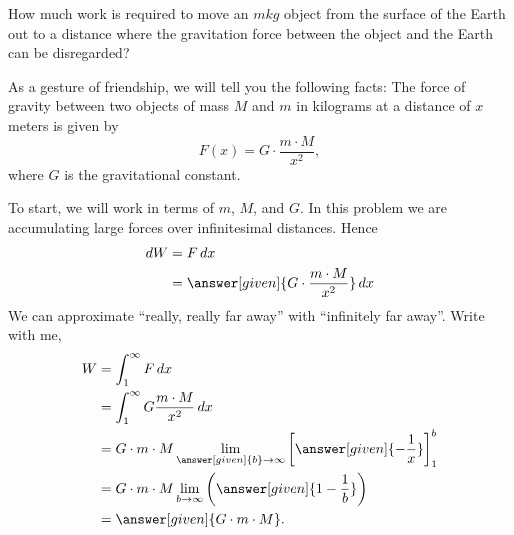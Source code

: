 \documentclass{ximera}
\begin{document}
\begin{example}
 How much work is required to move an $m\unit{kg}$ object from the
 surface of the Earth out to a distance where the gravitation force
 between the object and the Earth can be disregarded?

 As a gesture of friendship, we will tell you the following facts:
 The force of gravity between two objects of mass $M$ and $m$ in
 kilograms at a distance of $x$ meters is given by
 \[
 F(x) = G\cdot \frac{m\cdot M}{x^2},
 \]
 where $G$ is the gravitational constant.
 \begin{explanation}
   To start, we will work in terms of $m$, $M$, and $G$. In this
   problem we are accumulating large forces over infinitesimal
   distances. Hence
   \begin{align*}
     \d W &= F \d x\\
     &= \answer[given]{G\cdot \frac{m\cdot M}{x^2}} \d x
   \end{align*}
   We can approximate ``really, really far away'' with ``infinitely
   far away''. Write with me,
   \begin{align*}
     W &= \int_1^\infty F \d x\\
     &= \int_1^\infty G\frac{m\cdot M}{x^2} \d x\\
     &= G\cdot m\cdot M \lim_{\answer[given]{b} \to \infty} \eval{\answer[given]{-\frac{1}{x}}}_1^b\\
     &=G\cdot m\cdot M \lim_{b \to \infty} \left(\answer[given]{1 - \frac{1}{b}}\right)\\
     &=\answer[given]{G\cdot m\cdot M}.
   \end{align*}
 \end{explanation}
\end{example}
\end{document}
